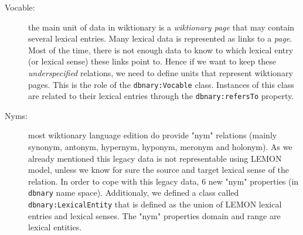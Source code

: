 \documentclass[10pt, a4paper]{article}
\begin{document}
\begin{description}
\begin{itemize}
\end{itemize}
\item[Vocable:] the main unit of data in wiktionary is a \textit{wiktionary page} that may contain several lexical entries. Many lexical data is represented as links to a \textit{page}. Most of the time, there is not enough data to know to which lexical entry (or lexical sense) these links point to. Hence if we want to keep these \textit{underspecified} relations, we need to define units that represent wiktionary pages. This is the role of the \texttt{dbnary:Vocable} class. Instances of this class are related to their lexical entries through the \texttt{dbnary:refersTo} property. 
\item[Nyms:] most wiktionary language edition do provide "nym" relations (mainly synonym, antonym, hypernym, hyponym, meronym and holonym). As we already mentioned this legacy data is not representable using LEMON model, unless we know for sure the source and target lexical sense of the relation. In order to cope with this legacy data, 6 new "nym" properties (in \texttt{dbnary} name space). Additionaly, we defined a class called \texttt{dbnary:LexicalEntity} that is defined as the union of LEMON lexical entries and lexical senses. The "nym" properties domain and range are lexical entities. 


\end{description}
\end{document}
